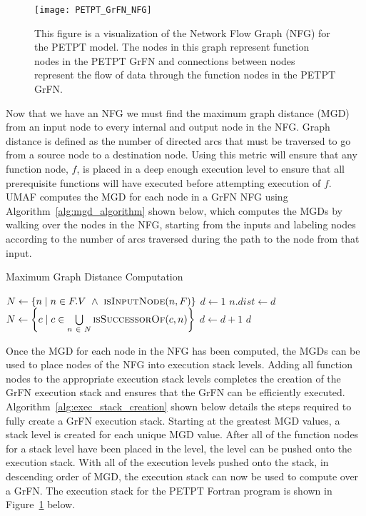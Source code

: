 \begin{figure}[!htbp]
    \label{fig:petpt_nfg}
    \centering
    \texttt{[image: PETPT\_GrFN\_NFG]}%
    \caption[PETPT GrFN Network Flow Graph]{This figure is a visualization of the Network Flow Graph (NFG) for the PETPT model. The nodes in this graph represent function nodes in the PETPT GrFN and connections between nodes represent the flow of data through the function nodes in the PETPT GrFN.}
\end{figure}

Now that we have an NFG we must find the maximum graph distance (MGD) from an input node to every internal and output node in the NFG.
Graph distance is defined as the number of directed arcs that must be traversed to go from a source node to a destination node.
Using this metric will ensure that any function node, $f$, is placed in a deep enough execution level to ensure that all prerequisite functions will have executed before attempting execution of $f$.
UMAF computes the MGD for each node in a GrFN NFG using Algorithm~\ref{alg:mgd_algorithm} shown below, which computes the MGDs by walking over the nodes in the NFG, starting from the inputs and labeling nodes according to the number of arcs traversed during the path to the node from that input.

\begin{algorithm}
  \caption{Maximum Graph Distance Computation}
  \label{alg:mgd_algorithm}
  \begin{algorithmic}[1]
     
      \State $N \gets \{n \mid n \in F.V~\land~\Call{isInputNode}{n, F} \}$ 
      \State $d \gets 1$
          \State $n.dist \gets d$ 
        \EndFor
      	\State $N \gets \left\{ c \mid c \in \bigcup\limits_{n~\in~N}^{} \Call{isSuccessorOf}{c, n} \right\}$ 
        \State $d \gets d + 1$
      \EndWhile
      \State \Return $d$
    \EndProcedure
  \end{algorithmic}
\end{algorithm}

Once the MGD for each node in the NFG has been computed, the MGDs can be used to place nodes of the NFG into execution stack levels.
Adding all function nodes to the appropriate execution stack levels completes the creation of the GrFN execution stack and ensures that the GrFN can be efficiently executed.
Algorithm~\ref{alg:exec_stack_creation} shown below details the steps required to fully create a GrFN execution stack.
Starting at the greatest MGD values, a stack level is created for each unique MGD value.
After all of the function nodes for a stack level have been placed in the level, the level can be pushed onto the execution stack.
With all of the execution levels pushed onto the stack, in descending order of MGD, the execution stack can now be used to compute over a GrFN.
The execution stack for the PETPT Fortran program is shown in Figure~\ref{fig:petpt_nfg} below.


